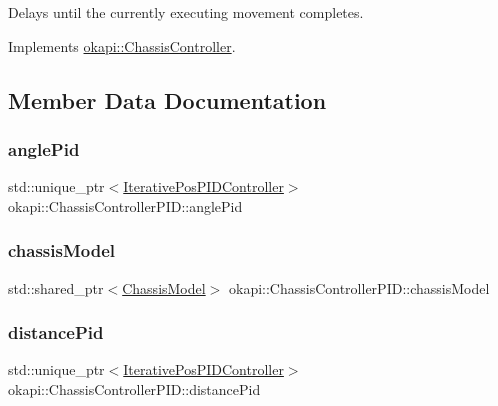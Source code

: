 Delays until the currently executing movement completes. 

Implements \mbox{\hyperlink{classokapi_1_1ChassisController_a01ed4e0eb7332cc149228387bbf1e91c}{okapi\+::\+Chassis\+Controller}}.



\subsection{Member Data Documentation}
\mbox{\label{classokapi_1_1ChassisControllerPID_a22677f191a4014e51f4f133d56d3bc76}} 
\subsubsection{\texorpdfstring{anglePid}{anglePid}}
{\footnotesize\ttfamily std\+::unique\+\_\+ptr$<$\mbox{\hyperlink{classokapi_1_1IterativePosPIDController}{Iterative\+Pos\+P\+I\+D\+Controller}}$>$ okapi\+::\+Chassis\+Controller\+P\+I\+D\+::angle\+Pid\hspace{0.3cm}{\ttfamily [protected]}}

\mbox{\label{classokapi_1_1ChassisControllerPID_a3a5e73a21423f3a278b2e3b891960c7d}} 
\subsubsection{\texorpdfstring{chassisModel}{chassisModel}}
{\footnotesize\ttfamily std\+::shared\+\_\+ptr$<$\mbox{\hyperlink{classokapi_1_1ChassisModel}{Chassis\+Model}}$>$ okapi\+::\+Chassis\+Controller\+P\+I\+D\+::chassis\+Model\hspace{0.3cm}{\ttfamily [protected]}}

\mbox{\label{classokapi_1_1ChassisControllerPID_a130a3d5ecf1e9dbb0d6884e4378b1887}} 
\subsubsection{\texorpdfstring{distancePid}{distancePid}}
{\footnotesize\ttfamily std\+::unique\+\_\+ptr$<$\mbox{\hyperlink{classokapi_1_1IterativePosPIDController}{Iterative\+Pos\+P\+I\+D\+Controller}}$>$ okapi\+::\+Chassis\+Controller\+P\+I\+D\+::distance\+Pid\hspace{0.3cm}{\ttfamily [protected]}}

